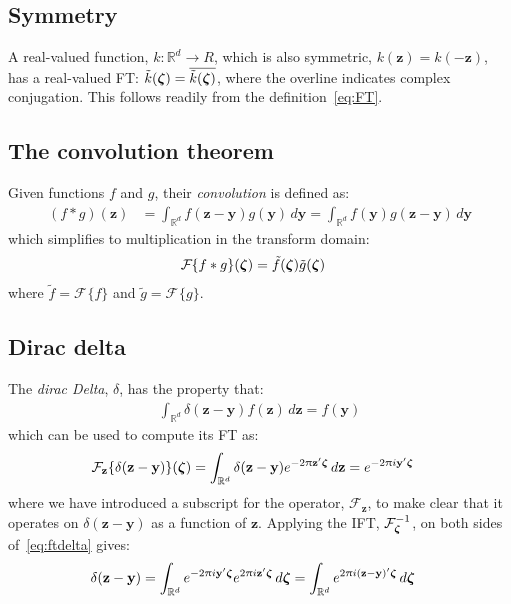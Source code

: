\documentclass[a4paper,oneside,12pt,english]{report}
\def\zvec{\mathbf{z}}
\def\R{\mathbb{R}}
\def\yvec{\mathbf{y}}
\def\funcdef#1#2#3{#1:#2\to#3}
\def\Fset{\mathcal{F}}
\newcommand\FT[2][]{\Fset_{#1}\{#2\}}
\def\conj#1{\overline{#1}}
\begin{document}
\subsection{Symmetry}
A real-valued function, $\funcdef{k}{\R^d}{R}$, which is also symmetric, $k(\zvec)=k(-\zvec)$, has a real-valued FT: $\tilde k(\zetavec) = \conj{\tilde k(\zetavec)}$, where the overline indicates complex conjugation. This follows readily from the definition~\eqref{eq:FT}.

\subsection{The convolution theorem}
Given functions $f$ and $g$, their \emph{convolution} is defined as:
\begin{align}
(f\ast g)(\zvec) &= \int_{\R^d} f(\zvec-\yvec)g(\yvec)\,d\yvec
= \int_{\R^d} f(\yvec)g(\zvec-\yvec)\,d\yvec
\end{align}
which simplifies to multiplication in the transform domain:
\begin{align}
\FT{f\ast g}(\zetavec) &= \tilde f(\zetavec)\tilde g(\zetavec)
\end{align}
where $\tilde f=\FT{f}$ and $\tilde g=\FT{g}$.


\subsection{Dirac delta}
The \emph{dirac Delta}, $\delta$, has the property that:
\begin{align}
\label{eq:delta}
\int_{\R^d} \delta(\zvec-\yvec) f(\zvec) \,d\zvec = f(\yvec) 
\end{align}
which can be used to compute its FT as:
\begin{align}
\label{eq:ftdelta}
\FT[\zvec]{\delta(\zvec-\yvec)}(\zetavec) &= \int_{\R^d} \delta(\zvec-\yvec)e^{-2\uppi\zvec'\zetavec}\,d\zvec
= e^{-2\uppi i\yvec'\zetavec}
\end{align}
where we have introduced a subscript for the operator, $\Fset_\zvec$, to make clear that it operates on $\delta(\zvec-\yvec)$ as a function of $\zvec$. Applying the IFT, $\Fset_{\zetavec}^{-1}$, on both sides of~\eqref{eq:ftdelta} gives:
\begin{align}
\label{eq:iftdelta}
\delta(\zvec-\yvec) &= \int_{\R^d} e^{-2\uppi i\yvec'\zetavec} e^{2\uppi i \zvec'\zetavec} \,d\zetavec
= \int_{\R^d} e^{2\uppi i(\zvec-\yvec)'\zetavec} \,d\zetavec
\end{align}
\end{document}
